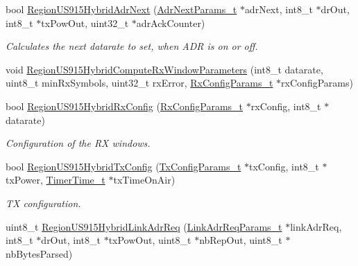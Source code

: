 \begin{DoxyCompactItemize}
bool \mbox{\hyperlink{group___r_e_g_i_o_n_u_s915_h_y_b_ga6cf3188c00bf9a9eaa7c62686dd4b391}{Region\+U\+S915\+Hybrid\+Adr\+Next}} (\mbox{\hyperlink{group___r_e_g_i_o_n_ga567c2742622326b350b4e91bbf61b4ce}{Adr\+Next\+Params\+\_\+t}} $\ast$adr\+Next, int8\+\_\+t $\ast$dr\+Out, int8\+\_\+t $\ast$tx\+Pow\+Out, uint32\+\_\+t $\ast$adr\+Ack\+Counter)
\begin{DoxyCompactList}\small\item\em Calculates the next datarate to set, when A\+DR is on or off. \end{DoxyCompactList}\item 
void \mbox{\hyperlink{group___r_e_g_i_o_n_u_s915_h_y_b_gaf5cfd5576e5648a2a0bb12a982beb973}{Region\+U\+S915\+Hybrid\+Compute\+Rx\+Window\+Parameters}} (int8\+\_\+t datarate, uint8\+\_\+t min\+Rx\+Symbols, uint32\+\_\+t rx\+Error, \mbox{\hyperlink{group___r_e_g_i_o_n_ga375c038078dfcfc7ef14280021db719e}{Rx\+Config\+Params\+\_\+t}} $\ast$rx\+Config\+Params)
\item 
bool \mbox{\hyperlink{group___r_e_g_i_o_n_u_s915_h_y_b_ga0f982743b1649a9491067676307a2e75}{Region\+U\+S915\+Hybrid\+Rx\+Config}} (\mbox{\hyperlink{group___r_e_g_i_o_n_ga375c038078dfcfc7ef14280021db719e}{Rx\+Config\+Params\+\_\+t}} $\ast$rx\+Config, int8\+\_\+t $\ast$datarate)
\begin{DoxyCompactList}\small\item\em Configuration of the RX windows. \end{DoxyCompactList}\item 
bool \mbox{\hyperlink{group___r_e_g_i_o_n_u_s915_h_y_b_gaad87151c4921c1caae24b3b8bb4135b9}{Region\+U\+S915\+Hybrid\+Tx\+Config}} (\mbox{\hyperlink{group___r_e_g_i_o_n_gabed730d4d04b0b60d4b6d1966d3f21d3}{Tx\+Config\+Params\+\_\+t}} $\ast$tx\+Config, int8\+\_\+t $\ast$tx\+Power, \mbox{\hyperlink{utilities_8h_a4215ca43d3e953099ea758ce428599d0}{Timer\+Time\+\_\+t}} $\ast$tx\+Time\+On\+Air)
\begin{DoxyCompactList}\small\item\em TX configuration. \end{DoxyCompactList}\item 
uint8\+\_\+t \mbox{\hyperlink{group___r_e_g_i_o_n_u_s915_h_y_b_gade4dc50b11235e0a6675b0d22240dea2}{Region\+U\+S915\+Hybrid\+Link\+Adr\+Req}} (\mbox{\hyperlink{group___r_e_g_i_o_n_gad4af503e8d4de1846129e26a799a1e8e}{Link\+Adr\+Req\+Params\+\_\+t}} $\ast$link\+Adr\+Req, int8\+\_\+t $\ast$dr\+Out, int8\+\_\+t $\ast$tx\+Pow\+Out, uint8\+\_\+t $\ast$nb\+Rep\+Out, uint8\+\_\+t $\ast$nb\+Bytes\+Parsed)

\end{DoxyCompactItemize}
